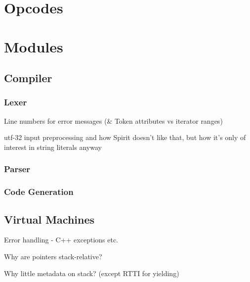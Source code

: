     
    \section{Opcodes}
    
    
    \section{Modules}
    
    
        \subsection{Compiler}
        
            \subsubsection{Lexer}
            Line numbers for error messages (\& Token attributes vs iterator ranges)
            
            utf-32 input preprocessing and how Spirit doesn't like that, but how it's only of interest in string literals anyway
            
            \subsubsection{Parser}
            
            \subsubsection{Code Generation}
            
        \subsection{Virtual Machines}
        
            Error handling - C++ exceptions etc.
            
            Why are pointers stack-relative?
            
            Why little metadata on stack? (except RTTI for yielding)
            
            
